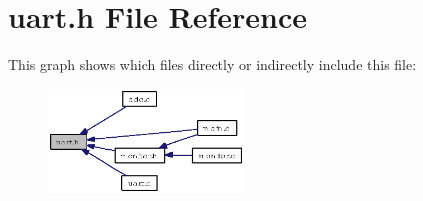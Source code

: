 \section{uart.h File Reference}
\label{uart_8h}


This graph shows which files directly or indirectly include this file:\begin{figure}[H]
\begin{center}
\leavevmode
\includegraphics[width=147pt]{uart_8h__dep__incl}
\end{center}
\end{figure}
